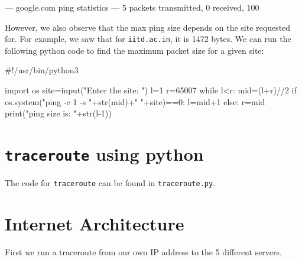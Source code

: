 \documentclass{article}
\begin{document}
\begin{enumerate}[a.]
\begin{code}
--- google.com ping statistics ---
5 packets transmitted, 0 received, 100%
\end{code}
However, we also observe that the max ping size depends on the site requested for. For example, we saw that for {\tt iitd.ac.in}, it is 1472 bytes.
We can run the following python code to find the maximum packet size for a given site:
\begin{code}
    #!/usr/bin/python3

    import os
    site=input("Enter the site: ")
    l=1
    r=65007
    while l<r:
        mid=(l+r)//2
        if os.system("ping -c 1 -s "+str(mid)+" "+site)==0:
            l=mid+1
        else:
            r=mid
    print("\n\nMax ping size is: "+str(l-1))
\end{code}
\end{enumerate}


\section{{\tt traceroute} using python}
The code for {\tt traceroute} can be found in {\tt traceroute.py}. 

\section{Internet Architecture}

First we run a traceroute from our own IP address to the 5 different servers.
\end{document}
